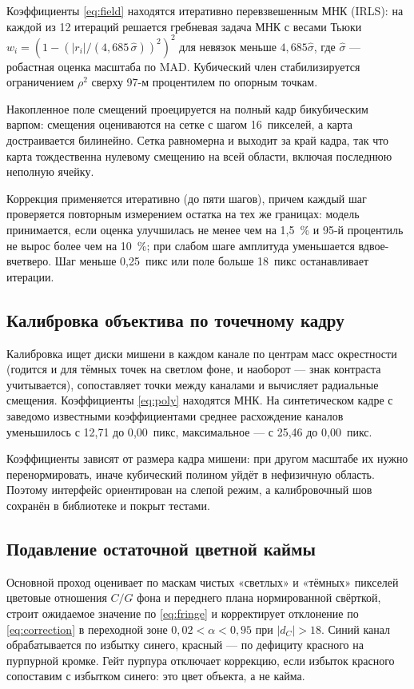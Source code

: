 \documentclass[a4paper,14pt,oneside]{extreport}
\begin{document}
Коэффициенты \eqref{eq:field} находятся итеративно перевзвешенным МНК
(IRLS): на каждой из 12 итераций
решается гребневая задача МНК с весами Тьюки $w_i=(1-(|r_i|/(4{,}685\,\hat
\sigma))^2)^2$ для невязок меньше $4{,}685\hat\sigma$, где $\hat\sigma$ ---
робастная оценка масштаба по MAD. Кубический член стабилизируется
ограничением $\rho^2$ сверху 97-м процентилем по опорным точкам.

Накопленное поле смещений проецируется на полный кадр бикубическим варпом:
смещения оцениваются на сетке с шагом 16~пикселей, а карта достраивается
билинейно. Сетка равномерна и выходит за край кадра, так что карта
тождественна нулевому смещению на всей области, включая последнюю неполную
ячейку.

Коррекция применяется итеративно (до пяти шагов), причем каждый шаг проверяется
повторным измерением остатка на тех же границах: модель принимается, если
оценка улучшилась не менее чем на 1{,}5~\% и 95-й процентиль не вырос более
чем на 10~\%; при слабом шаге амплитуда уменьшается вдвое-вчетверо. Шаг
меньше 0{,}25~пикс или поле больше 18~пикс останавливает итерации.

\subsection{Калибровка объектива по точечному кадру}

Калибровка ищет диски мишени в каждом канале по центрам масс окрестности
(годится и для тёмных точек на светлом фоне, и наоборот --- знак контраста
учитывается), сопоставляет точки между каналами и вычисляет радиальные
смещения. Коэффициенты \eqref{eq:poly} находятся МНК. На синтетическом кадре
с заведомо известными коэффициентами среднее расхождение каналов
уменьшилось с 12{,}71 до 0{,}00~пикс, максимальное --- с 25{,}46 до
0{,}00~пикс.

Коэффициенты зависят от размера кадра мишени: при другом масштабе их нужно
перенормировать, иначе кубический полином уйдёт в нефизичную область. Поэтому интерфейс ориентирован на слепой режим, а калибровочный
шов сохранён в библиотеке и покрыт тестами.

\subsection{Подавление остаточной цветной каймы}

Основной проход оценивает по маскам чистых «светлых» и «тёмных» пикселей
цветовые отношения $C/G$ фона и переднего плана нормированной свёрткой,
строит ожидаемое значение по \eqref{eq:fringe} и корректирует отклонение по
\eqref{eq:correction} в переходной зоне $0{,}02<\alpha<0{,}95$ при
$|d_C|>18$. Синий канал обрабатывается по избытку синего, красный --- по
дефициту красного на пурпурной кромке. Гейт пурпура отключает коррекцию,
если избыток красного сопоставим с избытком синего: это цвет объекта, а не
кайма.
\end{document}
